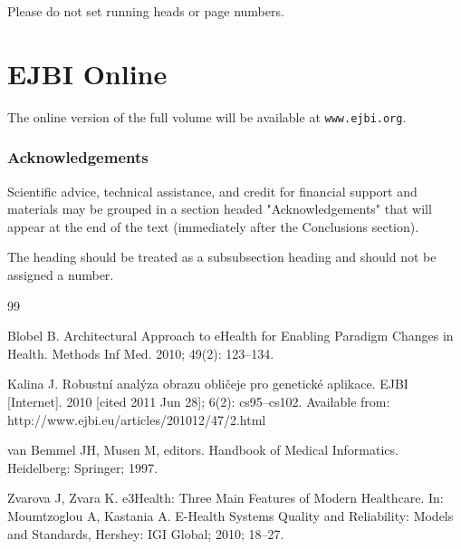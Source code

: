 \documentclass[a4paper,10pt,twocolumn,twoside,openright]{article}
\begin{document}
Please do not set running heads or page numbers.

\section{EJBI Online}

The online version of the full volume will be available at \texttt{www.ejbi.org}.


\subsubsection*{Acknowledgements} 

Scientific advice, technical assistance, and credit for financial support and materials may be grouped in a section headed "Acknowledgements" that will appear at the end of the text (immediately after the Conclusions section).

The heading should be treated as a subsubsection heading and should not be assigned a number.

\begin{thebibliography}{99}
\begin{footnotesize}

Blobel B. Architectural Approach to eHealth for Enabling Paradigm Changes in Health. Methods Inf Med. 2010; 49(2): 123--134. 


Kalina J. Robustn\'{i} anal\'{y}za obrazu obli\v{c}eje pro genetick\'{e} aplikace. EJBI [Internet]. 2010 [cited 2011 Jun 28]; 6(2): cs95--cs102. Available from:\\ http://www.ejbi.eu/articles/201012/47/2.html


van Bemmel JH, Musen M, editors. Handbook of Medical Informatics. Heidelberg: Springer; 1997.


 Zvarova J, Zvara K. e3Health: Three Main Features of Modern Healthcare. In: Moumtzoglou A, Kastania A. E-Health Systems Quality and Reliability: Models and Standards, Hershey: IGI Global; 2010; 18--27.

\end{footnotesize}
\end{thebibliography}
\end{document}
